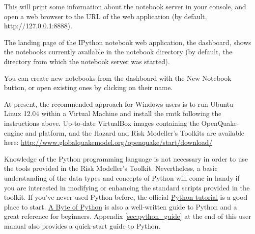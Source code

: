 This will print some information about the notebook server in your console, and open a web browser to the URL of the web application (by default, http://127.0.0.1:8888).

The landing page of the IPython notebook web application, the dashboard, shows the notebooks currently available in the notebook directory (by default, the directory from which the notebook server was started).

You can create new notebooks from the dashboard with the New Notebook button, or open existing ones by clicking on their name.

At present, the recommended approach for Windows users is to run Ubuntu Linux 12.04 within a Virtual Machine and install the rmtk following the instructions above. Up-to-date VirtualBox images containing the OpenQuake-engine and platform, and the Hazard and Risk Modeller's Toolkits are available here: \href{http://www.globalquakemodel.org/openquake/start/download/}{http://www.globalquakemodel.org/openquake/start/download/}

Knowledge of the Python programming language is not necessary in order to use the tools provided in the Risk Modeller's Toolkit. Nevertheless, a basic understanding of the data types and concepts of Python will come in handy if you are interested in modifying or enhancing the standard scripts provided in the toolkit. If you’ve never used Python before, the official \href{https://docs.python.org/2/tutorial/}{Python tutorial} is a good place to start. \href{http://www.swaroopch.com/notes/python/}{A Byte of Python} is also a well-written guide to Python and a great reference for beginners. Appendix \ref{sec:python_guide} at the end of this user manual also provides a quick-start guide to Python.